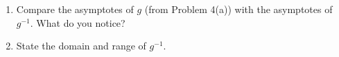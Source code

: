 \documentclass[12pt, twoside]{article}
\begin{document}
\begin{enumerate}[itemsep=0.4cm]
\begin{enumerate}[label=(\alph*), itemsep=0.4cm]
  \vspace{1.6cm}

  \item Compare the asymptotes of $g$ (from Problem 4(a)) with the
  asymptotes of $g^{-1}$. What do you notice?

  \vspace{2.0cm}

  \item State the domain and range of $g^{-1}$.

  \vspace{1.4cm}
\end{enumerate}

\end{enumerate}
\end{document}
